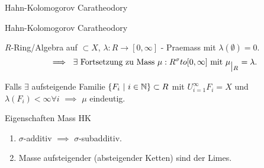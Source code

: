 \documentclass[class=article, crop=false]{standalone}
\begin{document}
\begin{zettel}{Hahn-Kolomogorov Caratheodory}
\begin{flashcard}[3bgjad2m]{Hahn-Kolomogorov Caratheodory}
	\begin{theorem}
		$R$-Ring/Algebra auf $\subset X$, $\lambda : R \to  [0,\infty]$ - Praemass mit $\lambda(\emptyset ) = 0$.
		\[
			\implies \exists \tx{Fortsetzung zu Mass} \mu : R^{\sigma}t o[0,\infty] \tx{mit} \mu \constrain R = \lambda
		.\]
	\end{theorem}

	Falls $\exists$ aufsteigende Familie $\set{F_i}{i \in \N} \subset R$ mit $U_{i = 1}^{\infty}F_i = X$ und $\lambda(F_i) < \infty \forall i$ $\implies$ $\mu$ eindeutig.
\end{flashcard}

\begin{flashcard}[v2z9a3l7]{Eigenschaften Mass HK}
	\begin{enumerate}
		\item $\sigma$-additiv $\implies$ $\sigma$-subadditiv.
		\item Masse aufsteigender (absteigender Ketten) sind der Limes.
	\end{enumerate}
\end{flashcard}
\end{zettel}
\end{document}
